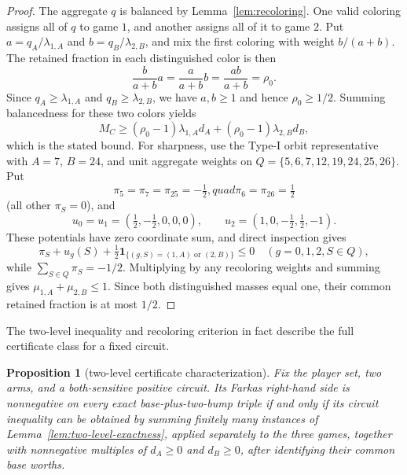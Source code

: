 \documentclass[11pt]{article}
\newtheorem{proposition}[theorem]{Proposition}
\begin{document}
\begin{proof}
The aggregate $q$ is balanced by Lemma~\ref{lem:recoloring}. One valid
coloring assigns all of $q$ to game $1$, and another assigns all of it to game
$2$. Put $a=q_A/\lambda_{1,A}$ and
$b=q_B/\lambda_{2,B}$, and mix the first coloring with weight
$b/(a+b)$. The retained fraction in each distinguished color is then
\[
 \frac{b}{a+b}a=\frac{a}{a+b}b
 =\frac{ab}{a+b}=\rho_0.
\]
Since $q_A\geq\lambda_{1,A}$ and $q_B\geq\lambda_{2,B}$, we have
$a,b\geq1$ and hence $\rho_0\geq1/2$. Summing balancedness for these two
colors yields
\[
 M_C\geq(\rho_0-1)\lambda_{1,A}d_A
       +(\rho_0-1)\lambda_{2,B}d_B,
\]
which is the stated bound.
For sharpness, use the Type-I orbit representative with $A=7$, $B=24$, and
unit aggregate weights on
$Q=\{5,6,7,12,19,24,25,26\}$. Put
\[
 \pi_5=\pi_7=\pi_{25}=-\tfrac12,quad
 \pi_6=\pi_{26}=\tfrac12
\]
(all other $\pi_S=0$), and
\[
 u_0=u_1=(\tfrac12,-\tfrac12,0,0,0),\qquad
 u_2=(1,0,-\tfrac12,\tfrac12,-1).
\]
These potentials have zero coordinate sum, and direct inspection gives
\[
 \pi_S+u_g(S)+\tfrac12\mathbf1_{\{(g,S)=(1,A)\text{ or }(2,B)\}}\leq0
 \quad(g=0,1,2, S\in Q),
\]
while $\sum_{S\in Q}\pi_S=-1/2$. Multiplying by any recoloring weights and
summing gives $\mu_{1,A}+\mu_{2,B}\leq1$. Since both distinguished masses
equal one, their common retained fraction is at most $1/2$.
\end{proof}

The two-level inequality and recoloring criterion in fact describe the full
certificate class for a fixed circuit.

\begin{proposition}[two-level certificate characterization]
\label{prop:two-level-characterization}
Fix the player set, two arms, and a both-sensitive positive circuit. Its
Farkas right-hand side is nonnegative on every exact base-plus-two-bump triple
if and only if its circuit inequality can be obtained by summing finitely many
instances of Lemma~\ref{lem:two-level-exactness}, applied separately to the
three games, together with nonnegative multiples of $d_A\geq0$ and
$d_B\geq0$, after identifying their common base worths.
\end{proposition}
\end{document}

